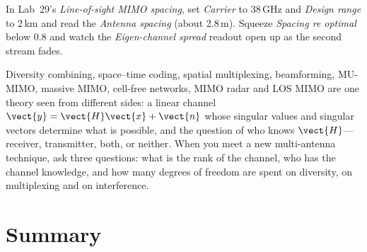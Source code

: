 \begin{tryit}
In Lab~29's \emph{Line-of-sight MIMO spacing}, set \emph{Carrier} to 38\,GHz and \emph{Design
range} to 2\,km and read the \emph{Antenna spacing} (about 2.8\,m). Squeeze \emph{Spacing re optimal}
below 0.8 and watch the \emph{Eigen-channel spread} readout open up as the second stream fades.
\end{tryit}

\begin{keyidea}
Diversity combining, space--time coding, spatial multiplexing, beamforming, MU-MIMO, massive MIMO,
cell-free networks, MIMO radar and LOS MIMO are one theory seen from different sides: a linear
channel $\vect{y}=\vect{H}\vect{x}+\vect{n}$ whose singular values and singular vectors determine what
is possible, and the question of who knows $\vect{H}$---receiver, transmitter, both, or neither.
When you meet a new multi-antenna technique, ask three questions: what is the rank of the channel,
who has the channel knowledge, and how many degrees of freedom are spent on diversity, on
multiplexing and on interference.
\end{keyidea}

\section{Summary}
\label{sec:ch19:summary}

